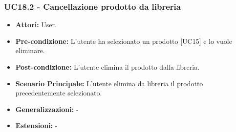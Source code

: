 \subsubsection{UC18.2 - Cancellazione prodotto da libreria}
\begin{itemize}
    \item \textbf{Attori:} User.
    \item \textbf{Pre-condizione:} L'utente ha selezionato un prodotto [UC15] e lo vuole eliminare.
    \item \textbf{Post-condizione:} L'utente elimina il prodotto dalla libreria.
    \item \textbf{Scenario Principale:} L'utente elimina da libreria il prodotto precedentemente selezionato.   
    \item \textbf{Generalizzazioni:} -
    \item \textbf{Estensioni:} -
\end{itemize}
